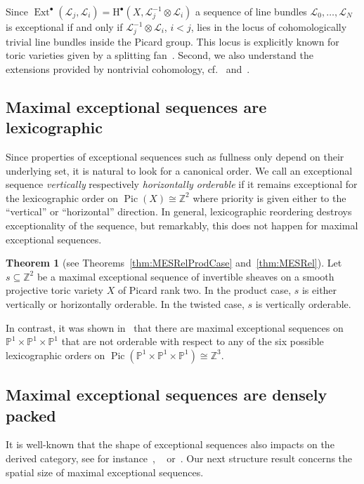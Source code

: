 \documentclass[11pt]{article}
\theoremstyle{definition}
\numberwithin{equation}{section}
\newcommand{\PP}{\mathbb P}
\newcommand{\Z}{\mathbb Z}
\newcommand{\CL}{{\mathcal L}}
\newcommand{\Pic}{\operatorname{Pic}}
\newcommand{\gExt}{\operatorname{Ext}}
\newcommand{\kss}{\scriptscriptstyle}
\newcommand{\kbb}{{\kss \bullet}}
\newcommand{\cl}{s}
\newtheorem{main}{Theorem}
\begin{document}
Since $\gExt^\kbb(\CL_j,\CL_i)=
\mathrm{H}^\kbb(X,\CL_j^{-1}\otimes\CL_i)$
a sequence of line bundles $\CL_0,\ldots,\CL_N$ 
is exceptional if and only if $\CL_j^{-1}\otimes\CL_i$, 
$i<j$, lies in the locus of cohomologically trivial 
line bundles inside the Picard group. This locus is 
explicitly known for toric varieties given by a splitting 
fan~\cite{immaculate}. Second, we also understand 
the extensions provided by nontrivial cohomology, 
cf.~\cite{dop} and~\cite{displayingExt}.

\subsection{Maximal exceptional sequences are lexicographic}
\label{subsubsec:LexExSeq}
Since properties of exceptional sequences such 
as fullness only depend on their underlying set,
it is natural to look for a canonical order. 
{We call an exceptional sequence 
{\em vertically} respectively 
{\em horizontally orderable} if it remains 
exceptional for the lexicographic order on 
\mbox{$\Pic(X)\cong\Z^2$} where priority is given 
either to the ``vertical'' or ``horizontal'' 
direction. In general, lexicographic 
reordering destroys exceptionality of the 
sequence, but remarkably, this does not 
happen for maximal exceptional sequences.}

  \begin{main}[{see Theorems~\ref{thm:MESRelProdCase} and~\ref{thm:MESRel}}] \label{thm:introA}
 Let $\cl\subseteq\Z^2$ be a maximal 
exceptional sequence of invertible sheaves on 
a smooth projective toric variety $X$ of Picard 
rank two. In the product case, $\cl$ 
is either vertically or horizontally orderable. 
In the twisted case, $\cl$ is vertically orderable.
 \end{main}

In contrast, it was shown in~\cite[Example 3.5]{p1p1p1} 
that there are maximal exceptional sequences on
$\PP^1\times\PP^1\times\PP^1$ {that are not 
orderable with respect to any of the six possible 
lexicographic orders on 
$\Pic(\PP^1\times\PP^1\times\PP^1)\cong\Z^3$}.

\subsection{Maximal exceptional sequences are densely packed}
\label{subsubsec:PropExSeq}
It is well-known that the shape of exceptional 
sequences also impacts on the derived category, 
see for instance~\cite{resCatLMS},
~\cite{resCatCompositio} or~\cite{Mironov}. 
Our next structure result concerns the 
spatial size of maximal exceptional sequences. 
\end{document}
